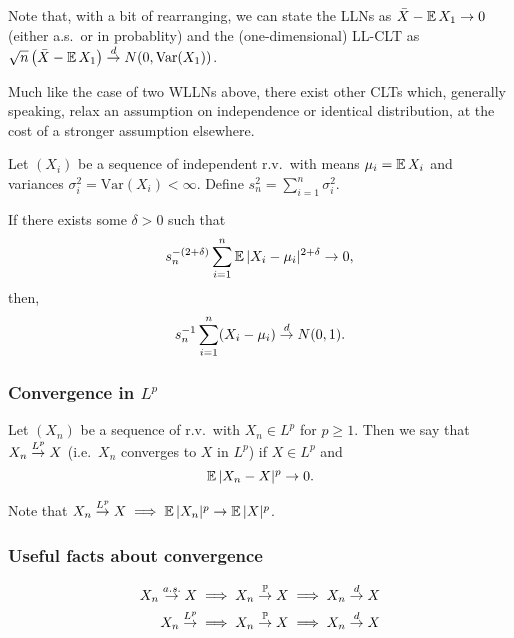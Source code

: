 Note that, with a bit of rearranging, we can state the LLNs as 
$\bar{X} - \operatorname*{\mathbb{E}} X_1 \rightarrow 0$ (either a.s.\ or in probablity) and the (one-dimensional) LL-CLT as 
$\sqrt{n} \left( \bar{X} - \operatorname*{\mathbb{E}} X_1 \right) \overset{d}{\rightarrow} N(0, \text{Var}(X_1))$.

Much like the case of two WLLNs above, there exist other CLTs which, generally speaking, relax an assumption on 
independence or identical distribution, at the cost of a stronger 
assumption elsewhere. 

\begin{theorem}
    Let $(X_i)$ be a sequence of independent r.v.\ with means 
    $\mu_i = \operatorname*{\mathbb{E}} X_i$ and variances $\sigma^2_i = \text{Var}(X_i) < \infty$.
    Define $s_n^2 = \sum_{i=1}^{n} \sigma_i^2$. 

    If there exists some $\delta > 0$ such that 
    \[
        s_n^{-(2+\delta)} \sum_{i=1}^{n} \operatorname*{\mathbb{E}} |X_i - \mu_i|^{2+\delta} 
        \rightarrow 
        0,
    \]
    then,
    \[
        s_n^{-1} \sum_{i=1}^{n} (X_i - \mu_i)
        \overset{d}{\rightarrow}
        N(0,1).
    \]
\end{theorem}

\subsubsection{Convergence in $L^p$}

\begin{definition}[$L^p$ convergence]
    Let $(X_n)$ be a sequence of r.v.\ with $X_n \in L^p$ for 
    $p \geq 1$. Then 
    we say that $X_n \overset{L^{p}}{\rightarrow} X$ (i.e.\ $X_n$ converges to $X$ in $L^p$) 
    if $X \in L^p$ and 
    \[
        \operatorname*{\mathbb{E}} |X_n - X|^p
        \rightarrow 
        0.
    \]
\end{definition}

Note that $X_n \overset{L^{p}}{\rightarrow} X \implies \operatorname*{\mathbb{E}} |X_n|^p \rightarrow \operatorname*{\mathbb{E}} |X|^p$.

\subsubsection{Useful facts about convergence}

\begin{fact}
    \begin{align*}
        X_n \overset{a.s.}{\rightarrow} X &\implies X_n \overset{\operatorname*{\mathbb{P}}}{\rightarrow} X \implies X_n \overset{d}{\rightarrow} X \\
        X_n \overset{L^{p}}{\rightarrow} &\implies X_n \overset{\operatorname*{\mathbb{P}}}{\rightarrow} X \implies X_n \overset{d}{\rightarrow} X
    \end{align*}
\end{fact}


